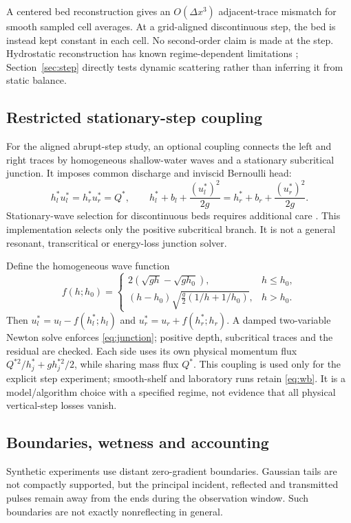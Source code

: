 \documentclass[11pt]{article}
\begin{document}
A centered bed reconstruction gives an $O(\Delta x^3)$ adjacent-trace mismatch
for smooth sampled cell averages. At a grid-aligned discontinuous step, the bed
is instead kept constant in each cell. No second-order claim is made at the
step. Hydrostatic reconstruction has known regime-dependent limitations
\cite{delestre}; Section~\ref{sec:step} directly tests dynamic scattering rather
than inferring it from static balance.

\subsection{Restricted stationary-step coupling}
For the aligned abrupt-step study, an optional coupling connects the left and
right traces by homogeneous shallow-water waves and a stationary subcritical
junction. It imposes common discharge and inviscid Bernoulli head:
\begin{equation}
 h_l^*u_l^*=h_r^*u_r^*=Q^*,\qquad
 h_l^*+b_l+\frac{(u_l^*)^2}{2g}
 =h_r^*+b_r+\frac{(u_r^*)^2}{2g}. \label{eq:junction}
\end{equation}
Stationary-wave selection for discontinuous beds requires additional care
\cite{lefloch}. This implementation selects only the positive subcritical branch.
It is not a general resonant, transcritical or energy-loss junction solver.

Define the homogeneous wave function
\begin{equation}
 f(h;h_0)=\begin{cases}
 2(\sqrt{gh}-\sqrt{gh_0}),&h\leq h_0,\\
 (h-h_0)\sqrt{\tfrac g2(1/h+1/h_0)},&h>h_0.
 \end{cases}
\end{equation}
Then $u_l^*=u_l-f(h_l^*;h_l)$ and
$u_r^*=u_r+f(h_r^*;h_r)$. A damped two-variable Newton solve enforces
\eqref{eq:junction}; positive depth, subcritical traces and the residual are
checked. Each side uses its own physical momentum flux
$Q^{*2}/h_j^*+gh_j^{*2}/2$, while sharing mass flux $Q^*$.
This coupling is used only for the explicit step experiment; smooth-shelf and
laboratory runs retain \eqref{eq:wb}. It is a model/algorithm choice with a
specified regime, not evidence that all physical vertical-step losses vanish.

\subsection{Boundaries, wetness and accounting}
Synthetic experiments use distant zero-gradient boundaries. Gaussian tails are
not compactly supported, but the principal incident, reflected and transmitted
pulses remain away from the ends during the observation window. Such boundaries
are not exactly nonreflecting in general.
\end{document}
